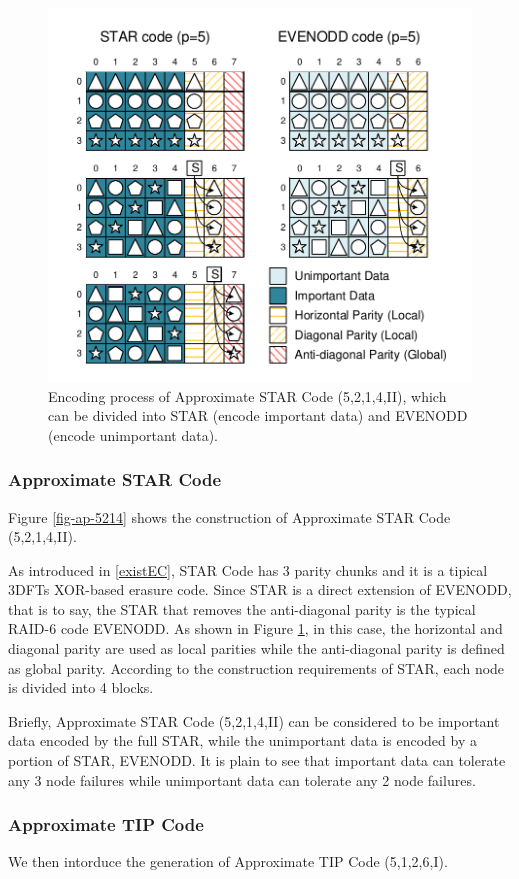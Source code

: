 \documentclass[sigconf]{acmart}
\begin{document}
\begin{figure}[ht]
\includegraphics[width =0.8\linewidth]{photo/EVENODD-STAR-v2.pdf}
\caption{Encoding process of Approximate STAR Code (5,2,1,4,II), which can be divided into STAR (encode important data) and EVENODD (encode unimportant data).}\label{fig-star}
\end{figure}

\subsubsection{Approximate STAR Code}
Figure \ref{fig-ap-5214} shows the construction of Approximate STAR Code (5,2,1,4,II).

As introduced in \ref{existEC}, STAR Code \cite{STAR} has 3 parity chunks and it is a tipical 3DFTs XOR-based erasure code.
Since STAR is a direct extension of EVENODD\cite{EVENODD}, that is to say, the STAR that removes the anti-diagonal parity is the typical RAID-6 code EVENODD. As shown in Figure \ref{fig-star}, in this case, the horizontal and diagonal parity are used as local parities while the anti-diagonal parity is defined as global parity.
According to the construction requirements of STAR, each node is divided into 4 blocks.

Briefly, Approximate STAR Code (5,2,1,4,II) can be considered to be important data encoded by the full STAR, while the unimportant data is encoded by a portion of STAR, EVENODD. It is plain to see that important data can tolerate any 3 node failures while unimportant data can tolerate any 2 node failures.

\subsubsection{Approximate TIP Code}
We then intorduce the generation of Approximate TIP Code (5,1,2,6,I).
\end{document}
